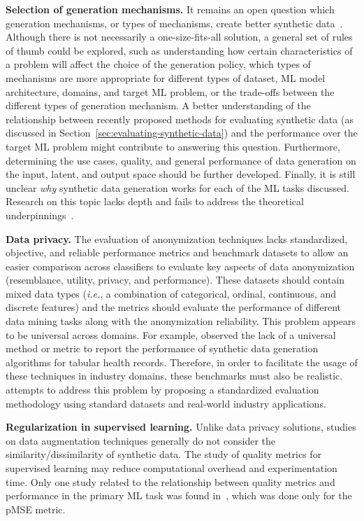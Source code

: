 \textbf{Selection of generation mechanisms.} It remains an open question
which generation mechanisms, or types of
mechanisms, create better synthetic data~\cite{cheung2020modals}. Although
there is not necessarily a one-size-fits-all solution, a general set of rules
of thumb could be explored, such as understanding how certain characteristics
of a problem will affect the choice of the generation policy, which types of
mechanisms are more appropriate for different types of dataset, ML model
architecture, domains, and target ML problem, or the trade-offs between the
different types of generation mechanism. A better understanding of the
relationship between recently proposed methods for evaluating synthetic data
(as discussed in Section~\ref{sec:evaluating-synthetic-data}) and the
performance over the target ML problem might contribute to answering this question.
Furthermore, determining the use cases, quality, and general performance of
data generation on the input, latent, and output space should be further
developed. Finally, it is still unclear \textit{why} synthetic data generation
works for each of the ML tasks discussed. Research on this topic lacks depth
and fails to address the theoretical underpinnings~\cite{feng2021survey,
dao2019kernel}.

\textbf{Data privacy.} The evaluation of anonymization techniques lacks standardized,
objective, and
reliable performance metrics and benchmark datasets to allow an easier
comparison across classifiers to evaluate key aspects of data anonymization
(resemblance, utility, privacy, and performance). These datasets should contain
mixed data types (\textit{i.e.}, a combination of categorical, ordinal,
continuous, and discrete features) and the metrics should evaluate the
performance of different data mining tasks along with the anonymization
reliability. This problem appears to be universal across domains. For example,
\cite{hernandez2022synthetic} observed the lack of a universal method or
metric to report the performance of synthetic data generation algorithms for
tabular health records. Therefore, in order to facilitate the usage of these
techniques in industry domains, these benchmarks must also be
realistic. \cite{rosenblatt2020differentially} attempts to address this
problem by proposing a standardized evaluation methodology using standard
datasets and real-world industry applications.

\textbf{Regularization in supervised learning. }Unlike data privacy
solutions, studies on data augmentation techniques generally do not consider
the similarity/dissimilarity of synthetic data. The study of quality metrics
for supervised learning may reduce computational overhead and experimentation
time. Only one study related to the relationship between quality metrics
and performance in the primary ML task was found in~\cite{dankar2021fake},
which was done only for the pMSE metric.

